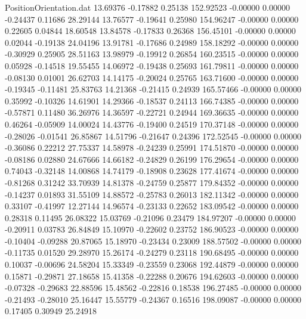 \begin{filecontents}{PositionOrientation.dat}
  13.69376   -0.17882    0.25138   152.92523   -0.00000    0.00000   -0.24437    0.11686   28.29144
  13.76577   -0.19641    0.25980   154.96247   -0.00000    0.00000    0.22605    0.04844   18.60548
  13.84578   -0.17833    0.26368   156.45101   -0.00000    0.00000    0.02044   -0.19138   24.04196
  13.91781   -0.17686    0.24989   158.18292   -0.00000    0.00000   -0.30929    0.25905   28.51163
  13.98979   -0.19912    0.26854   160.23515   -0.00000    0.00000    0.05928   -0.14518   19.55455
  14.06972   -0.19438    0.25693   161.79811   -0.00000    0.00000   -0.08130    0.01001   26.62703
  14.14175   -0.20024    0.25765   163.71600   -0.00000    0.00000   -0.19345   -0.11481   25.83763
  14.21368   -0.21415    0.24939   165.57466   -0.00000    0.00000    0.35992   -0.10326   14.61901
  14.29366   -0.18537    0.24113   166.74385   -0.00000    0.00000   -0.57871    0.11480   36.26976
  14.36597   -0.22721    0.24944   169.36635   -0.00000    0.00000    0.46264   -0.05909   14.00024
  14.43776   -0.19400    0.24519   170.37148   -0.00000    0.00000   -0.28026   -0.01541   26.85867
  14.51796   -0.21647    0.24396   172.52545   -0.00000    0.00000   -0.36086    0.22212   27.75337
  14.58978   -0.24239    0.25991   174.51870   -0.00000    0.00000   -0.08186    0.02880   24.67666
  14.66182   -0.24829    0.26199   176.29654   -0.00000    0.00000    0.74043   -0.32148   14.00868
  14.74179   -0.18908    0.23628   177.41674   -0.00000    0.00000   -0.81268    0.31242   33.70939
  14.81378   -0.24759    0.25877   179.84352   -0.00000    0.00000   -0.14237    0.01893   31.55109
  14.88572   -0.25783    0.26013   182.11342   -0.00000    0.00000    0.33107   -0.41997   12.27144
  14.96574   -0.23133    0.22652   183.09542   -0.00000    0.00000    0.28318    0.11495   26.08322
  15.03769   -0.21096    0.23479   184.97207   -0.00000    0.00000   -0.20911    0.03783   26.84849
  15.10970   -0.22602    0.23752   186.90523   -0.00000    0.00000   -0.10404   -0.09288   20.87065
  15.18970   -0.23434    0.23009   188.57502   -0.00000    0.00000   -0.11735    0.01520   29.28970
  15.26174   -0.24279    0.23118   190.68495   -0.00000    0.00000    0.10037   -0.00696   24.58204
  15.33349   -0.23559    0.23068   192.44879   -0.00000    0.00000    0.15871   -0.29871   27.18658
  15.41358   -0.22288    0.20676   194.62603   -0.00000    0.00000   -0.07328   -0.29683   22.88596
  15.48562   -0.22816    0.18538   196.27485   -0.00000    0.00000   -0.21493   -0.28010   25.16447
  15.55779   -0.24367    0.16516   198.09087   -0.00000    0.00000    0.17405    0.30949   25.24918

\end{filecontents}
